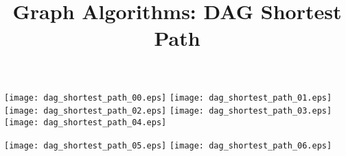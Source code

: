 \documentclass{article}
\title{Graph Algorithms: DAG Shortest Path}
\begin{document}
\maketitle
{}\vspace{1em}


\vspace{1em}


\texttt{[image: dag\_shortest\_path\_00.eps]}
\vspace{1em}
\texttt{[image: dag\_shortest\_path\_01.eps]}
\vspace{1em}
\texttt{[image: dag\_shortest\_path\_02.eps]}
\vspace{1em}
\texttt{[image: dag\_shortest\_path\_03.eps]}
\vspace{1em}
\texttt{[image: dag\_shortest\_path\_04.eps]}
\vspace{1em}


\texttt{[image: dag\_shortest\_path\_05.eps]}
\vspace{1em}
\texttt{[image: dag\_shortest\_path\_06.eps]}
\end{document}

